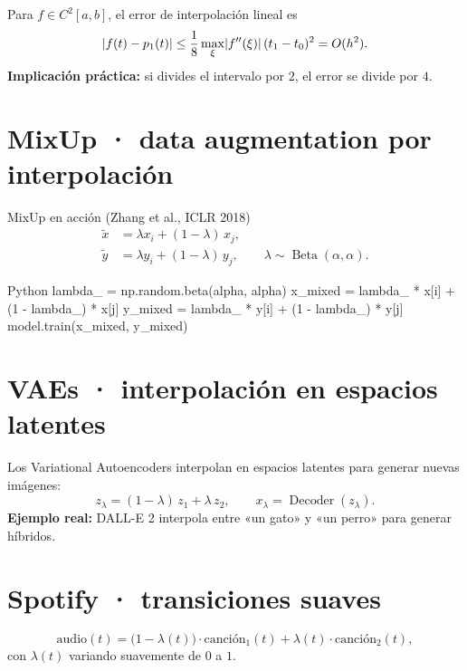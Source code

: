 \documentclass{claudeeditorial}
\begin{document}
\begin{ClaudeInfo}
Para $f\in C^2[a,b]$, el error de interpolación lineal es
\[
  \lvert f(t) - p_1(t)\rvert \leq \frac{1}{8}\max_\xi \lvert f''(\xi)\rvert\,(t_1-t_0)^2 = O(h^2).
\]
\textbf{Implicación práctica:} si divides el intervalo por $2$, el error se divide por $4$.
\end{ClaudeInfo}


\section{MixUp · data augmentation por interpolación}

\begin{ClaudeCard}{MixUp en acción (Zhang et al., ICLR 2018)}
\begin{align*}
  \tilde{x} &= \lambda x_i + (1-\lambda)\,x_j, \\
  \tilde{y} &= \lambda y_i + (1-\lambda)\,y_j, \qquad
  \lambda \sim \operatorname{Beta}(\alpha,\alpha).
\end{align*}
\end{ClaudeCard}

\begin{ClaudeCode}[title={MixUp · 4 líneas, +2-4\,\% de precisión en ImageNet}]{Python}
lambda_ = np.random.beta(alpha, alpha)
x_mixed = lambda_ * x[i] + (1 - lambda_) * x[j]
y_mixed = lambda_ * y[i] + (1 - lambda_) * y[j]
model.train(x_mixed, y_mixed)
\end{ClaudeCode}

\section{VAEs · interpolación en espacios latentes}

Los Variational Autoencoders interpolan en espacios latentes para generar nuevas imágenes:
\[
  z_\lambda = (1-\lambda)\,z_1 + \lambda\,z_2, \qquad x_\lambda = \operatorname{Decoder}(z_\lambda).
\]
\textbf{Ejemplo real:} DALL-E 2 interpola entre «un gato» y «un perro» para generar híbridos.

\section{Spotify · transiciones suaves}

\[
  \text{audio}(t) = \bigl(1-\lambda(t)\bigr)\cdot\text{canción}_1(t) + \lambda(t)\cdot\text{canción}_2(t),
\]
con $\lambda(t)$ variando suavemente de $0$ a $1$.
\end{document}
